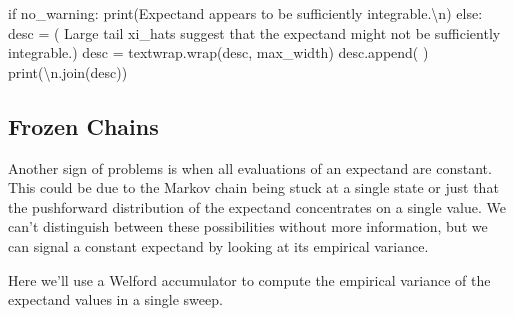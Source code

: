 \documentclass[
  letterpaper,
  DIV=11,
  numbers=noendperiod]{scrartcl}
\newenvironment{Shaded}{\begin{snugshade}}{\end{snugshade}}
\newcommand{\BuiltInTok}[1]{\textcolor[rgb]{0.00,0.23,0.31}{#1}}
\newcommand{\CharTok}[1]{\textcolor[rgb]{0.13,0.47,0.30}{#1}}
\newcommand{\ControlFlowTok}[1]{\textcolor[rgb]{0.00,0.23,0.31}{#1}}
\newcommand{\NormalTok}[1]{\textcolor[rgb]{0.00,0.23,0.31}{#1}}
\newcommand{\OperatorTok}[1]{\textcolor[rgb]{0.37,0.37,0.37}{#1}}
\newcommand{\StringTok}[1]{\textcolor[rgb]{0.13,0.47,0.30}{#1}}
\begin{document}
\begin{Shaded}
\begin{Highlighting}[]
  \ControlFlowTok{if}\NormalTok{ no\_warning:}
    \BuiltInTok{print}\NormalTok{(}\StringTok{\textquotesingle{}Expectand appears to be sufficiently integrable.}\CharTok{\textbackslash{}n}\StringTok{\textquotesingle{}}\NormalTok{)}
  \ControlFlowTok{else}\NormalTok{:}
\NormalTok{    desc }\OperatorTok{=}\NormalTok{ (}\StringTok{\textquotesingle{}  Large tail xi\_hats suggest that the expectand might\textquotesingle{}}
            \StringTok{\textquotesingle{}not be sufficiently integrable.\textquotesingle{}}\NormalTok{)}
\NormalTok{    desc }\OperatorTok{=}\NormalTok{ textwrap.wrap(desc, max\_width)}
\NormalTok{    desc.append(}\StringTok{\textquotesingle{} \textquotesingle{}}\NormalTok{)}
    \BuiltInTok{print}\NormalTok{(}\StringTok{\textquotesingle{}}\CharTok{\textbackslash{}n}\StringTok{\textquotesingle{}}\NormalTok{.join(desc))}
\end{Highlighting}
\end{Shaded}

\subsection{Frozen Chains}\label{frozen-chains}

Another sign of problems is when all evaluations of an expectand are
constant. This could be due to the Markov chain being stuck at a single
state or just that the pushforward distribution of the expectand
concentrates on a single value. We can't distinguish between these
possibilities without more information, but we can signal a constant
expectand by looking at its empirical variance.

Here we'll use a Welford accumulator to compute the empirical variance
of the expectand values in a single sweep.
\end{document}
